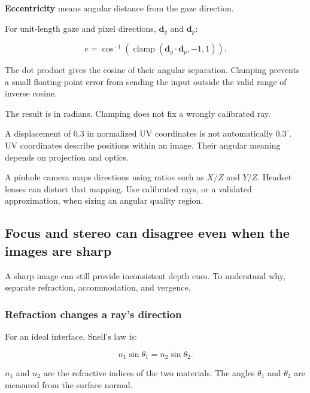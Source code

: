 \hypertarget{04-visual-computing-ii-ch042-measuring-distance-from-gaze}{}

\textbf{Eccentricity} means angular distance from the gaze direction.

For unit-length gaze and pixel directions, \(\mathbf d_g\) and \(\mathbf d_p\):

\[
e=\cos^{-1}\left(
\operatorname{clamp}(\mathbf d_g\cdot\mathbf d_p,-1,1)
\right).
\]

The dot product gives the cosine of their angular separation. Clamping prevents a small floating-point error from sending the input outside the valid range of inverse cosine.

The result is in radians. Clamping does not fix a wrongly calibrated ray.

A displacement of 0.3 in normalized UV coordinates is not automatically \(0.3^\circ\). UV coordinates describe positions within an image. Their angular meaning depends on projection and optics.

A pinhole camera maps directions using ratios such as \(X/Z\) and \(Y/Z\). Headset lenses can distort that mapping. Use calibrated rays, or a validated approximation, when sizing an angular quality region.

\subsection{Focus and stereo can disagree even when the images are sharp}\label{04-visual-computing-ii-ch042-focus-and-stereo-can-disagree-even-when-the-images-are-sharp}

\hypertarget{04-visual-computing-ii-ch042-focus-and-stereo-can-disagree-even-when-the-images-are-sharp}{}

A sharp image can still provide inconsistent depth cues. To understand why, separate refraction, accommodation, and vergence.

\subsubsection{Refraction changes a ray's direction}\label{04-visual-computing-ii-ch042-refraction-changes-a-rays-direction}

\hypertarget{04-visual-computing-ii-ch042-refraction-changes-a-rays-direction}{}

For an ideal interface, Snell's law is:

\[
n_1\sin\theta_1=n_2\sin\theta_2.
\]

\(n_1\) and \(n_2\) are the refractive indices of the two materials. The angles \(\theta_1\) and \(\theta_2\) are measured from the surface normal.

